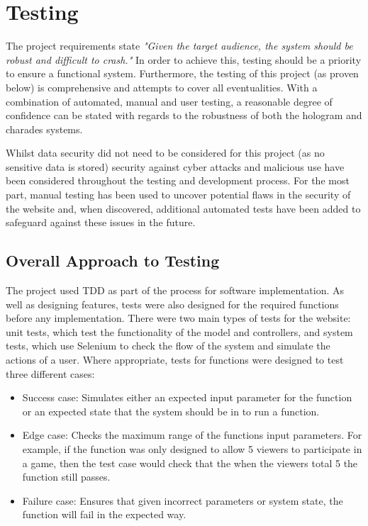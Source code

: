 \chapter{Testing}

The project requirements state \textit{"Given the target audience, the system should be robust and difficult to crash."} In order to achieve this, testing should be a priority to ensure a functional system. Furthermore, the testing of this project (as proven below) is comprehensive and attempts to cover all eventualities. With a combination of automated, manual and user testing, a reasonable degree of confidence can be stated with regards to the robustness of both the hologram and charades systems. 

Whilst data security did not need to be considered for this project (as no sensitive data is stored) security against cyber attacks and malicious use have been considered throughout the testing and development process. For the most part, manual testing has been used to uncover potential flaws in the security of the website and, when discovered, additional automated tests have been added to safeguard against these issues in the future.

\section{Overall Approach to Testing}
The project used TDD as part of the process for software implementation. As well as designing features, tests were also designed for the required functions before any implementation. There were two main types of tests for the website: unit tests, which test the functionality of the model and controllers, and system tests, which use Selenium to check the flow of the system and simulate the actions of a user. Where appropriate, tests for functions were designed to test three different cases:

\begin{itemize}
\item Success case: Simulates either an expected input parameter for the function or an expected state that the system should be in to run a function.

\item Edge case: Checks the maximum range of the functions input parameters. For example, if the function was only designed to allow 5 viewers to participate in a game, then the test case would check that the when the viewers total 5 the function still passes.

\item Failure case: Ensures that given incorrect parameters or system state, the function will fail in the expected way.

\end{itemize}

